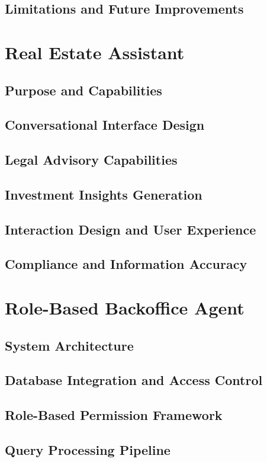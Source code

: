 \subsection{Limitations and Future Improvements}

\section{Real Estate Assistant}
\subsection{Purpose and Capabilities}
\subsection{Conversational Interface Design}
\subsection{Legal Advisory Capabilities}
\subsection{Investment Insights Generation}
\subsection{Interaction Design and User Experience}
\subsection{Compliance and Information Accuracy}

\section{Role-Based Backoffice Agent}
\subsection{System Architecture}
\subsection{Database Integration and Access Control}
\subsection{Role-Based Permission Framework}
\subsection{Query Processing Pipeline}
